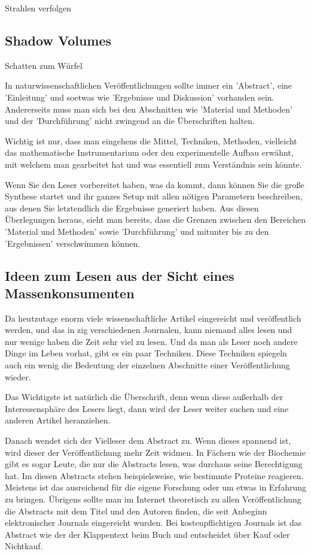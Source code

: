 \documentclass[10pt,twocolumn]{scrartcl}
\begin{document}
Strahlen verfolgen

\subsection{Shadow Volumes}

Schatten zum Würfel

In naturwissenschaftlichen Veröffentlichungen sollte immer 
ein 'Abstract', eine 'Einleitung' und soetwas wie 'Ergebnisse und
Diskussion' vorhanden sein. Andererseits muss man sich bei den
Abschnitten wie 'Material und Methoden' und der 'Durchführung'
nicht zwingend an die Überschriften halten. 

Wichtig ist nur, dass man eingehens die Mittel, Techniken,
Methoden, vielleicht das mathematische Instrumentarium 
oder den experimentelle Aufbau erwähnt, mit welchem man 
gearbeitet hat und was essentiell zum Verständnis sein könnte.

Wenn Sie den Leser vorbereitet haben, was da kommt, dann können
Sie die große Synthese startet und ihr ganzes Setup mit allen
nötigen Parametern beschreiben, aus denen Sie letztendlich
die Ergebnisse generiert haben. Aus diesen Überlegungen heraus, 
sieht man bereits, dass die Grenzen zwischen den Bereichen 
'Material und Methoden' sowie 'Durchführung' und mitunter 
bis zu den 'Ergebnissen' verschwimmen können.

\subsection*{Ideen zum Lesen aus der Sicht eines Massenkonsumenten}

Da heutzutage enorm viele wissenschaftliche Artikel
eingereicht und veröffentlich werden, und das in zig verschiedenen
Journalen, kann niemand alles lesen und nur wenige haben die Zeit 
sehr viel zu lesen. Und da man als Leser noch andere Dinge im Leben 
vorhat, gibt es ein paar Techniken.
Diese Techniken spiegeln auch ein wenig die Bedeutung der einzelnen 
Abschnitte einer Veröffentlichung wieder.

Das Wichtigste ist natürlich die Überschrift, denn wenn diese außerhalb
der Interessensphäre des Lesers liegt, dann wird der Leser weiter suchen
und eine anderen Artikel heranziehen.

Danach wendet sich der Vielleser dem Abstract zu. Wenn dieses spannend ist,
wird dieser der Veröffentlichung mehr Zeit widmen. In Fächern wie der
Biochemie gibt es sogar Leute, die nur die Abstracts lesen, was durchaus
seine Berechtigung hat. Im diesen Abstracts stehen beispielsweise, 
wie bestimmte Proteine reagieren. Meistens ist das ausreichend für 
die eigene Forschung oder um etwas in Erfahrung zu bringen.
Übrigens sollte man im Internet theoretisch zu allen Veröffentlichung
die Abstracts mit dem Titel und den Autoren finden, die seit Anbeginn 
elektronischer Journals eingereicht wurden. Bei kostenpflichtigen 
Journals ist das Abstract wie der der Klappentext beim Buch und
entscheidet über Kauf oder Nichtkauf.
\end{document}
